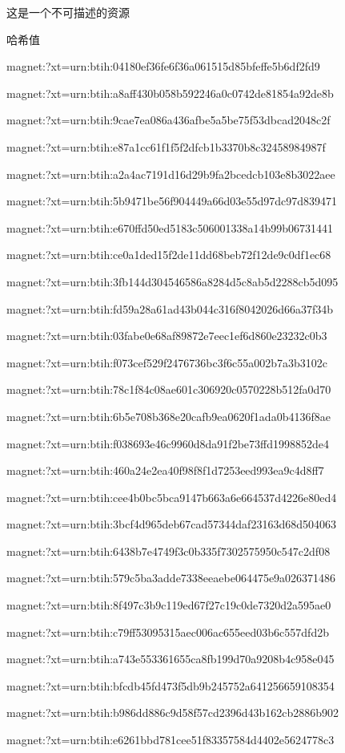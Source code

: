 \documentclass[UTF8]{ctexart}
\begin{document}
这是一个不可描述的资源
\par 哈希值
\par[1]  magnet:?xt=urn:btih:04180ef36fe6f36a061515d85bfeffe5b6df2fd9
\par[2]  magnet:?xt=urn:btih:a8aff430b058b592246a0c0742de81854a92de8b
\par[3]  magnet:?xt=urn:btih:9cae7ea086a436afbe5a5be75f53dbcad2048c2f
\par[4]  magnet:?xt=urn:btih:e87a1cc61f1f5f2dfcb1b3370b8c32458984987f
\par[5]  magnet:?xt=urn:btih:a2a4ac7191d16d29b9fa2bcedcb103e8b3022aee
\par[6]  magnet:?xt=urn:btih:5b9471be56f904449a66d03e55d97dc97d839471
\par[7]  magnet:?xt=urn:btih:e670ffd50ed5183c506001338a14b99b06731441
\par[8]  magnet:?xt=urn:btih:ce0a1ded15f2de11dd68beb72f12de9c0df1ec68
\par[9]  magnet:?xt=urn:btih:3fb144d304546586a8284d5c8ab5d2288cb5d095
\par[10] magnet:?xt=urn:btih:fd59a28a61ad43b044c316f8042026d66a37f34b
\par[11] magnet:?xt=urn:btih:03fabe0e68af89872e7eec1ef6d860e23232c0b3
\par[12] magnet:?xt=urn:btih:f073cef529f2476736bc3f6c55a002b7a3b3102c
\par[13] magnet:?xt=urn:btih:78c1f84c08ae601c306920c0570228b512fa0d70
\par[14] magnet:?xt=urn:btih:6b5e708b368e20cafb9ea0620f1ada0b4136f8ae
\par[15] magnet:?xt=urn:btih:f038693e46c9960d8da91f2be73ffd1998852de4
\par[16] magnet:?xt=urn:btih:460a24e2ea40f98f8f1d7253eed993ea9c4d8ff7
\par[17] magnet:?xt=urn:btih:cee4b0bc5bca9147b663a6e664537d4226e80ed4
\par[18] magnet:?xt=urn:btih:3bcf4d965deb67cad57344daf23163d68d504063
\par[19] magnet:?xt=urn:btih:6438b7e4749f3c0b335f7302575950c547c2df08
\par[20] magnet:?xt=urn:btih:579c5ba3adde7338eeaebe064475e9a026371486
\par[21] magnet:?xt=urn:btih:8f497c3b9c119ed67f27c19c0de7320d2a595ae0
\par[22] magnet:?xt=urn:btih:c79ff53095315aec006ac655eed03b6c557dfd2b
\par[23] magnet:?xt=urn:btih:a743e553361655ca8fb199d70a9208b4c958e045
\par[24] magnet:?xt=urn:btih:bfcdb45fd473f5db9b245752a641256659108354
\par[25] magnet:?xt=urn:btih:b986dd886c9d58f57cd2396d43b162cb2886b902
\par[26] magnet:?xt=urn:btih:e6261bbd781cee51f83357584d4402e5624778c3
\end{document}
